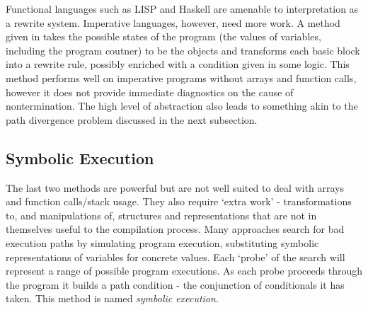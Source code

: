 \documentclass[12pt,a4paper]{article}
\begin{document}
Functional languages such as LISP and Haskell are amenable to interpretation as a rewrite system. Imperative languages, however, need more work. A method given in \citep{tra} takes the possible states of the program (the values of variables, including the program coutner) to be the objects and transforms each basic block into a rewrite rule, possibly enriched with a condition given in some logic. This method performs well on imperative programs without arrays and function calls, however
it does not provide immediate diagnostics on the cause of nontermination. The high level of abstraction also leads to something akin to the path divergence problem
discussed in the next subsection.

\subsection{Symbolic Execution}\label{revSymEx}
The last two methods are powerful but are not well suited to deal with arrays and function calls/stack usage. They also require `extra work' - transformations to, and manipulations of, structures and representations that are not in themselves useful to the compilation process. Many approaches search for bad execution paths by
simulating program execution, substituting symbolic representations of variables for concrete values. Each `probe' of the search will represent a range of possible program executions. As each
probe proceeds through the program it builds a path condition - the conjunction of conditionals it has taken. This method is named \emph{symbolic execution}.\\
\end{document}
